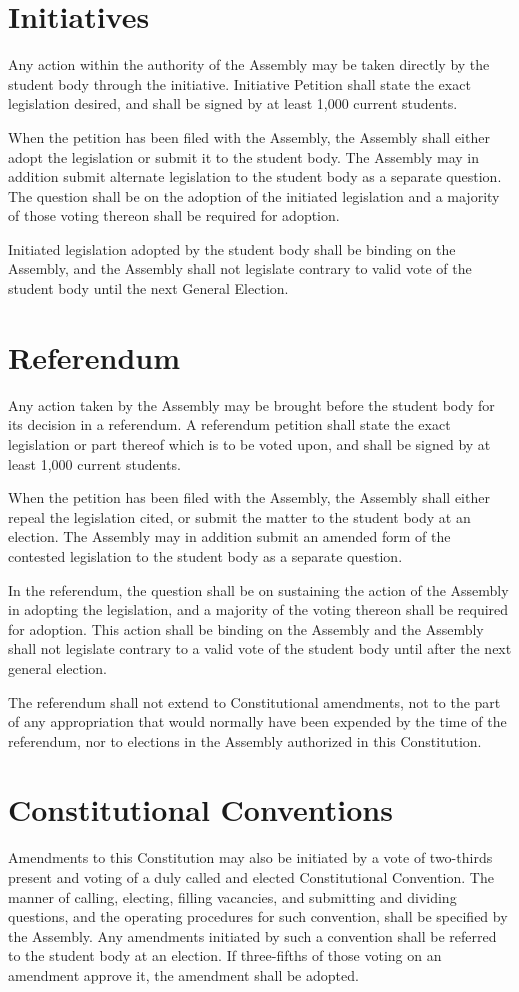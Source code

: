 \section{Initiatives}
   Any action within the authority of the Assembly may be taken directly by the student body through the initiative. Initiative Petition shall state the exact legislation desired, and shall be signed by at least 1,000 current students.
   
   When the petition has been filed with the Assembly, the Assembly shall either adopt the legislation or submit it to the student body. The Assembly may in addition submit alternate legislation to the student body as a separate question. The question shall be on the adoption of the initiated legislation and a majority of those voting thereon shall be required for adoption.

   Initiated legislation adopted by the student body shall be binding on the Assembly, and the Assembly shall not legislate contrary to valid vote of the student body until the next General Election.

\section{Referendum}
   Any action taken by the Assembly may be brought before the student body for its decision in a referendum. A referendum petition shall state the exact legislation or part thereof which is to be voted upon, and shall be signed by at least 1,000 current students.

   When the petition has been filed with the Assembly, the Assembly shall either repeal the legislation cited, or submit the matter to the student body at an election. The Assembly may in addition submit an amended form of the contested legislation to the student body as a separate question.

   In the referendum, the question shall be on sustaining the action of the Assembly in adopting the legislation, and a majority of the voting thereon shall be required for adoption. This action shall be binding on the Assembly and the Assembly shall not legislate contrary to a valid vote of the student body until after the next general election.

   The referendum shall not extend to Constitutional amendments, not to the part of any appropriation that would normally have been expended by the time of the referendum, nor to elections in the Assembly authorized in this Constitution.

\section{Constitutional Conventions}
   Amendments to this Constitution may also be initiated by a vote of two-thirds present and voting of a duly called and elected Constitutional Convention. The manner of calling, electing, filling vacancies, and submitting and dividing questions, and the operating procedures for such convention, shall be specified by the Assembly. Any amendments initiated by such a convention shall be referred to the student body at an election. If three-fifths of those voting on an amendment approve it, the amendment shall be adopted.